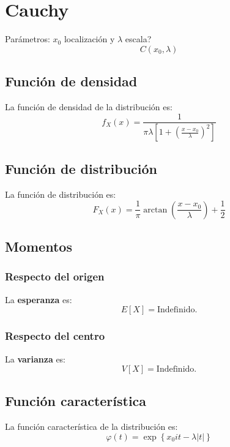 \section{Cauchy}
\label{sec:cauchy}
Parámetros: $x_0$ localización y $\lambda$ escala?
\[
\boxed{C\left( x_0, \lambda \right)}
\]

\subsection{Función de densidad}
La función de densidad de la distribución es:
\[
f_X \left( x \right) = \frac{1}{\pi \lambda \left[ 1 + \left( \frac{x - x_0}{\lambda} \right)^2 \right]}
\]

\subsection{Función de distribución}
La función de distribución es:
\[
F_X\left( x \right) = \frac{1}{\pi} \arctan \left( \frac{x - x_0}{\lambda} \right) + \frac{1}{2}
\]

\subsection{Momentos}

\subsubsection*{Respecto del origen}
La \textbf{esperanza} es: 
\[
    E\left[ X \right] = \text{Indefinido.}
\]
\subsubsection*{Respecto del centro}
La \textbf{varianza} es:
\[
    V\left[ X \right] = \text{Indefinido.} 
\]

\subsection{Función característica}
La función característica de la distribución es:
\[
\varphi\left( t \right) = \exp\left\{ x_0 i t - \lambda \lvert t \rvert \right\}
\]

